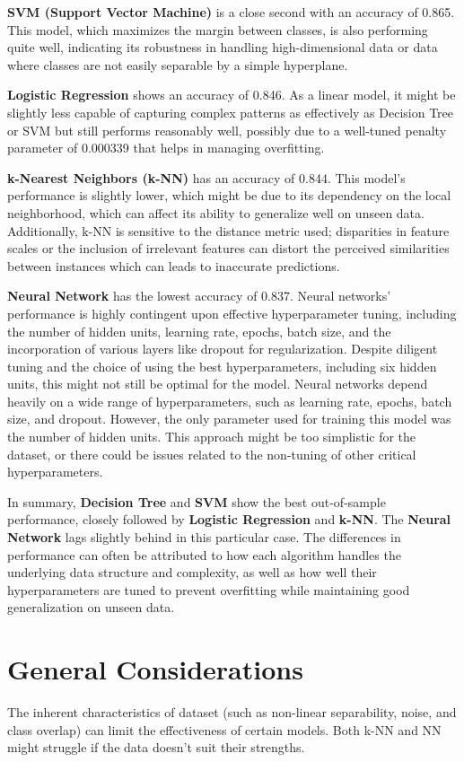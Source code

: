\documentclass{article}
\begin{document}
\textbf{SVM (Support Vector Machine)} is a close second with an accuracy of 0.865. This model, which maximizes the margin between classes, is also performing quite well, indicating its robustness in handling high-dimensional data or data where classes are not easily separable by a simple hyperplane.

\textbf{Logistic Regression} shows an accuracy of 0.846. As a linear model, it might be slightly less capable of capturing complex patterns as effectively as Decision Tree or SVM but still performs reasonably well, possibly due to a well-tuned penalty parameter of 0.000339 that helps in managing overfitting.

\textbf{k-Nearest Neighbors (k-NN)} has an accuracy of 0.844. This model's performance is slightly lower, which might be due to its dependency on the local neighborhood, which can affect its ability to generalize well on unseen data.  Additionally, k-NN is sensitive to the distance metric used; disparities in feature scales or the inclusion of irrelevant features can distort the perceived similarities between instances which can leads to inaccurate predictions.

\textbf{Neural Network} has the lowest accuracy of 0.837. Neural networks' performance is highly contingent upon effective hyperparameter tuning, including the number of hidden units, learning rate, epochs, batch size, and the incorporation of various layers like dropout for regularization. Despite diligent tuning and the choice of using the best hyperparameters, including six hidden units, this might not still be optimal for the model. Neural networks depend heavily on a wide range of hyperparameters, such as learning rate, epochs, batch size, and dropout. However, the only parameter used for training this model was the number of hidden units. This approach might be too simplistic for the dataset, or there could be issues related to the non-tuning of other critical hyperparameters.

In summary, \textbf{Decision Tree} and \textbf{SVM} show the best out-of-sample performance, closely followed by \textbf{Logistic Regression} and \textbf{k-NN}. The \textbf{Neural Network} lags slightly behind in this particular case. The differences in performance can often be attributed to how each algorithm handles the underlying data structure and complexity, as well as how well their hyperparameters are tuned to prevent overfitting while maintaining good generalization on unseen data.

\section*{General Considerations}
The inherent characteristics of dataset (such as non-linear separability, noise, and class overlap) can limit the effectiveness of certain models. Both k-NN and NN might struggle if the data doesn't suit their strengths.
\end{document}
